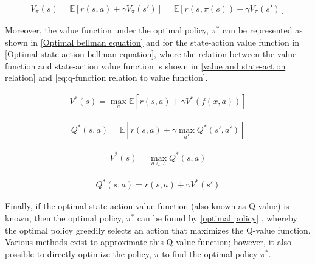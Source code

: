 \begin{equation}
	\begin{aligned}
		V_{\pi}(s) = \mathbb{E} \left[r(s,a) + \gamma V_{\pi}(s') \right] = \mathbb{E} \left[r(s,\pi(s)) + \gamma V_{\pi}(s') \right]
	\end{aligned}
	\label{eq:bellman equation for value iteration}
\end{equation}

Moreover, the value function under the optimal policy, $\pi^*$ can be represented as shown in \autoref{Optimal bellman equation} and for the state-action value function in \autoref{Optimal state-action bellman equation}, where the relation between the value function and state-action value function is shown in \autoref{value and state-action relation} and \autoref{eq:q-function relation to value function}.

\begin{equation}
	\begin{aligned}
		V^*(s) =\max_{a} \mathbb{E} \left[r(s,a) + \gamma V^*(f(x,a)) \right]
	\end{aligned}
	\label{Optimal bellman equation}
\end{equation}

\begin{equation}
	\begin{aligned}
		Q^*(s,a) =\mathbb{E} \left[r(s,a) + \gamma \max_{a'}Q^*(s',a') \right]
	\end{aligned}
	\label{Optimal state-action bellman equation}
\end{equation}

\begin{equation}
	\begin{aligned}
		V^*(s) = \max_{a\in A} Q^*(s, a)
	\end{aligned}
	\label{value and state-action relation}
\end{equation}

\begin{equation}
	\begin{aligned}
		Q^*(s,a) = r(s,a) + \gamma V^*(s') 
	\end{aligned}
	\label{eq:q-function relation to value function}
\end{equation}

Finally, if the optimal state-action value function  (also known as Q-value) is known, then the optimal policy, $\pi^*$ can be found by \autoref{optimal policy} \cite{raoOPTIMALPOLICYOPTIMAL}, whereby the optimal policy greedily selects an action that maximizes the Q-value function.
Various methods exist to approximate this Q-value function; however, it also possible to directly optimize the policy, $\pi$ to find the optimal policy $\pi^*$.

